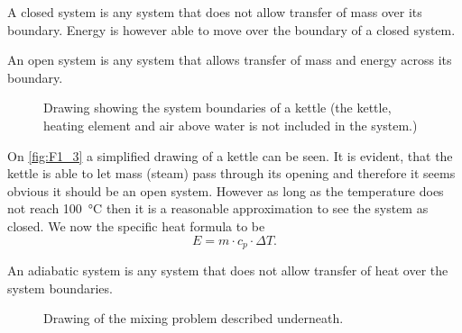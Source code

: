 \begin{definition}
  A closed system is any system that does not allow transfer of mass over its boundary. Energy is however able to move over the boundary of a closed system. 
\end{definition}

\begin{definition}
  An open system is any system that allows transfer of mass and energy across its boundary.
\end{definition}

\begin{figure}[ht]
  \centering
  \caption{Drawing showing the system boundaries of a kettle (the kettle, heating element and air above water is not included in the system.)}
  \label{fig:F1_3}
\end{figure}

\begin{eks}
  On \autoref{fig:F1_3} a simplified drawing of a kettle can be seen. It is evident, that the kettle is able to let mass (steam) pass through its opening and therefore it seems obvious it should be an open system. However as long as the temperature does not reach \qty{100}{\celsius} then it is a reasonable approximation to see the system as closed. We now the specific heat formula to be
  \[ 
  E = m \cdot c_p \cdot \Delta T
  .\]
\end{eks}

\begin{definition}
  An adiabatic system is any system that does not allow transfer of heat over the system boundaries.
\end{definition}

\begin{figure}[ht]
  \centering
  \caption{Drawing of the mixing problem described underneath.}
  \label{fig:F1_4}
\end{figure}

